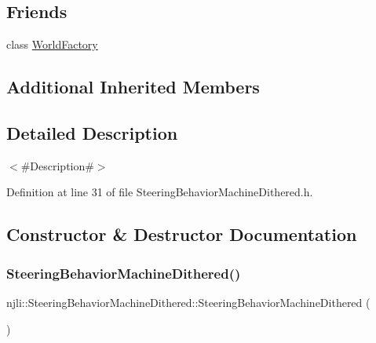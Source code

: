 \subsection*{Friends}
\begin{DoxyCompactItemize}
\item 
class \mbox{\hyperlink{classnjli_1_1_steering_behavior_machine_dithered_acb96ebb09abe8f2a37a915a842babfac}{World\+Factory}}
\end{DoxyCompactItemize}
\subsection*{Additional Inherited Members}


\subsection{Detailed Description}
$<$\#\+Description\#$>$ 

Definition at line 31 of file Steering\+Behavior\+Machine\+Dithered.\+h.



\subsection{Constructor \& Destructor Documentation}
\mbox{\label{classnjli_1_1_steering_behavior_machine_dithered_a5b4e9c96c351d5c3c131794e212eca17}} 
\subsubsection{\texorpdfstring{Steering\+Behavior\+Machine\+Dithered()}{SteeringBehaviorMachineDithered()}\hspace{0.1cm}{\footnotesize\ttfamily [1/3]}}
{\footnotesize\ttfamily njli\+::\+Steering\+Behavior\+Machine\+Dithered\+::\+Steering\+Behavior\+Machine\+Dithered (\begin{DoxyParamCaption}{ }\end{DoxyParamCaption})\hspace{0.3cm}{\ttfamily [protected]}}

